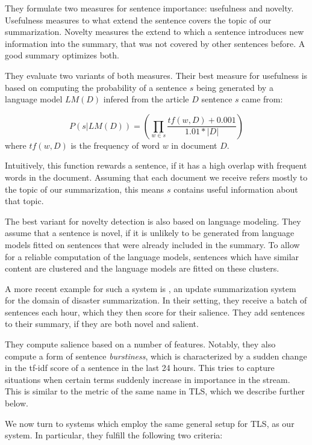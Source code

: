 \documentclass[a4paper,BCOR=10mm]{report}
\numberwithin{lemma}{chapter}
\numberwithin{definition}{chapter}
\begin{document}
They formulate two measures for sentence importance: usefulness and novelty.
Usefulness measures to what extend the sentence covers the topic of our summarization. Novelty measures the extend to which a sentence introduces new information into the summary, that was not covered by other sentences before.
A good summary optimizes both.

They evaluate two variants of both measures.
Their best measure for usefulness is based on computing the probability of a sentence $s$ being generated by a language model $LM(D)$ infered from the article $D$ sentence $s$ came from:

\begin{equation}
P(s|LM(D)) = (\prod_{w \in s} \frac{\mathit{tf}(w, D) + 0.001}{1.01 * |D|})
\end{equation}
where $\mathit{tf(w, D)}$ is the frequency of word $w$ in document $D$.

Intuitively, this function rewards a sentence, if it has a high overlap with frequent words in the document. Assuming that each document we receive refers mostly to the topic of our summarization, this means $s$ contains useful information about that topic.

The best variant for novelty detection is also based on language modeling.
They assume that a sentence is novel, if it is unlikely to be generated from language models fitted on sentences that were already included in the summary. To allow for a reliable computation of the language models, sentences which have similar content are clustered and the language models are fitted on these clusters.

A more recent example for such a system is \citet{salient-updates}, an update summarization system for the domain of disaster summarization.
In their setting, they receive a batch of sentences each hour, which they then score for their salience. They add sentences to their summary, if they are both novel and salient.

They compute salience based on a number of features. Notably, they also compute a form of sentence \textit{burstiness}, which is characterized by a sudden change in the tf-idf score of a sentence in the last 24 hours. This tries to capture situations when certain terms suddenly increase in importance in the stream. This is similar to the metric of the same name in TLS, which we describe further below.

We now turn to systems which employ the same general setup for TLS, as our system. In particular, they fulfill the following two criteria:
\end{document}
